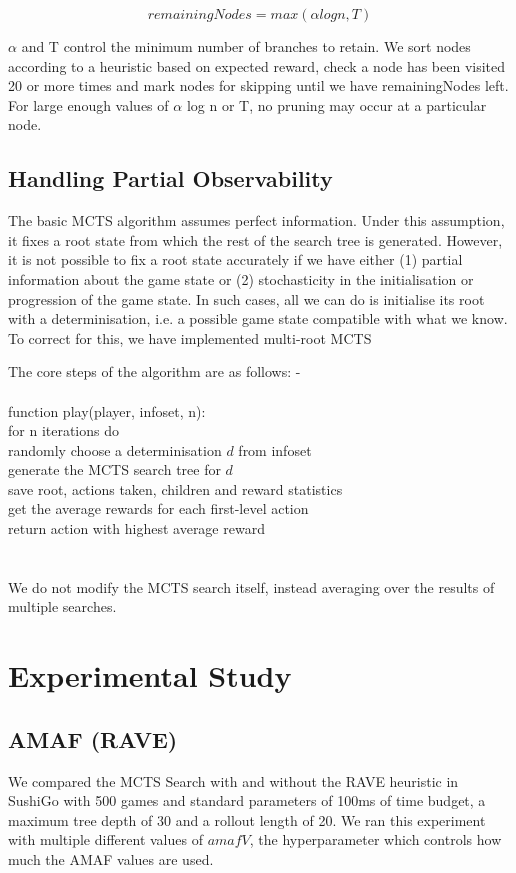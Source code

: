 \documentclass[conference]{IEEEtran}
\begin{document}
\begin{equation}
remainingNodes = max (\alpha log n, T) 
\end{equation}

${\alpha}$ and T control the minimum number of branches to retain. We sort nodes according to a heuristic based on expected reward, check a node has been visited 20 or more times and mark nodes for skipping until we have remainingNodes left. For large enough values of ${\alpha}$ log n or T, no pruning may occur at a particular node. 

\subsection{Handling Partial Observability}
The basic MCTS algorithm assumes perfect information. Under this assumption, it fixes a root state from which the rest of the search tree is generated. However, it is not possible to fix a root state accurately if we have either (1) partial information about the game state or (2) stochasticity in the initialisation or progression of the game state. In such cases, all we can do is initialise its root with a determinisation, i.e. a possible game state compatible with what we know. To correct for this, we have implemented multi-root MCTS

The core steps of the algorithm are as follows: -\\
\\
function play(player, infoset, n):\\
for n iterations do\\
\indent randomly choose a determinisation $d$ from infoset\\
\indent generate the MCTS search tree for $d$\\
\indent save root, actions taken, children and reward statistics\\
get the average rewards for each first-level action\\
return action with highest average reward\\
\\
\\
We do not modify the MCTS search itself, instead averaging over the results of multiple searches.

\section{Experimental Study}
\subsection{AMAF (RAVE)}
We compared the MCTS Search with and without the RAVE heuristic in SushiGo with 500 games and standard parameters of 100ms of time budget, a maximum tree depth of 30 and a rollout length of 20. We ran this experiment with multiple different values of $amafV$, the hyperparameter which controls how much the AMAF values are used.
\end{document}
